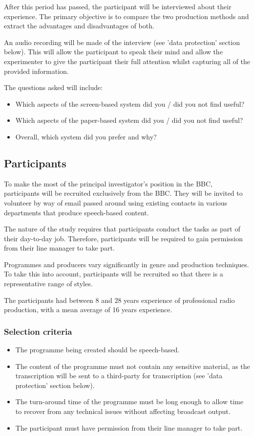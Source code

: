 After this period has passed, the participant will be interviewed about their experience. The primary objective is to
compare the two production methods and extract the advantages and disadvantages of both.

An audio recording will be made of the interview (see 'data protection' section below). This will allow the participant
to speak their mind and allow the experimenter to give the participant their full attention whilst capturing all of the
provided information.

The questions asked will include:
\begin{itemize}
\item Which aspects of the screen-based system did you / did you not find useful?
\item Which aspects of the paper-based system did you / did you not find useful?
\item Overall, which system did you prefer and why?
\end{itemize}


\subsection{Participants}
To make the most of the principal investigator's position in the BBC, participants will be recruited exclusively from
the BBC. They will be invited to volunteer by way of email passed around using existing contacts in various departments
that produce speech-based content. 

The nature of the study requires that participants conduct the tasks as part of their day-to-day job. Therefore,
participants will be required to gain permission from their line manager to take part.

Programmes and producers vary significantly in genre and production techniques.  To take this into account,
participants will be recruited so that there is a representative range of styles.

The participants had between 8 and 28 years experience of professional radio production, with a mean average of
16 years experience.

\subsubsection{Selection criteria}

\begin{itemize}
\item The programme being created should be speech-based.
\item The content of the programme must not contain any sensitive material, as the transcription will be sent to a
  third-party for transcription (see 'data protection' section below).
\item The turn-around time of the programme must be long enough to allow time to recover from any technical issues
  without affecting broadcast output.
\item The participant must have permission from their line manager to take part.
\end{itemize}

